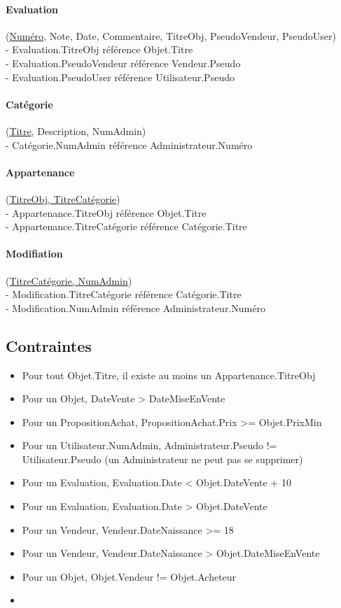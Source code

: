 \documentclass{article}
\begin{document}
\paragraph{Evaluation} (\underline{Numéro}, Note, Date, Commentaire, TitreObj, PseudoVendeur, PseudoUser)\\
\indent - Evaluation.TitreObj référence Objet.Titre\\
\indent - Evaluation.PseudoVendeur référence Vendeur.Pseudo\\
\indent - Evaluation.PseudoUser référence Utilisateur.Pseudo


\paragraph{Catégorie} (\underline{Titre}, Description, NumAdmin)\\
\indent - Catégorie.NumAdmin référence Administrateur.Numéro


\paragraph{Appartenance} (\underline{TitreObj, TitreCatégorie})\\
\indent - Appartenance.TitreObj référence Objet.Titre\\
\indent - Appartenance.TitreCatégorie référence Catégorie.Titre


\paragraph{Modifiation} (\underline{TitreCatégorie, NumAdmin})\\
\indent - Modification.TitreCatégorie référence Catégorie.Titre\\
\indent - Modification.NumAdmin référence Administrateur.Numéro


\subsection{Contraintes}

\begin{itemize}
\item Pour tout Objet.Titre, il existe au moins un Appartenance.TitreObj
\item Pour un Objet, DateVente > DateMiseEnVente
\item Pour un PropositionAchat, PropositionAchat.Prix >= Objet.PrixMin
\item Pour un Utilisateur.NumAdmin, Administrateur.Pseudo != Utilisateur.Pseudo (un Administrateur ne peut pas se supprimer)
\item Pour un Evaluation, Evaluation.Date < Objet.DateVente + 10
\item Pour un Evaluation, Evaluation.Date > Objet.DateVente
\item Pour un Vendeur, Vendeur.DateNaissance >= 18
\item Pour un Vendeur, Vendeur.DateNaissance > Objet.DateMiseEnVente
\item Pour un Objet, Objet.Vendeur != Objet.Acheteur
\item 
\end{itemize}
\end{document}
